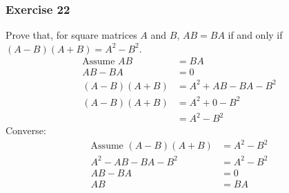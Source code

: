 \documentclass{math}
\begin{document}
\subsubsection*{Exercise 22}
Prove that, for square matrices \( A \) and \( B \), \( AB = BA \) if and only
if \( (A-B)(A+B) = A^2-B^2 \).
\begin{align*}
  \text{Assume } AB &= BA \\
  AB-BA &= 0 \\
  (A-B)(A+B) &= A^2+AB-BA-B^2 \\
  (A-B)(A+B) &= A^2+0-B^2 \\
  &= A^2-B^2
\end{align*}
Converse:
\begin{align*}
  \text{Assume } (A-B)(A+B) &= A^2-B^2 \\
  A^2-AB-BA-B^2 &= A^2-B^2 \\
  AB-BA &= 0 \\
  AB &= BA
\end{align*}
\end{document}
